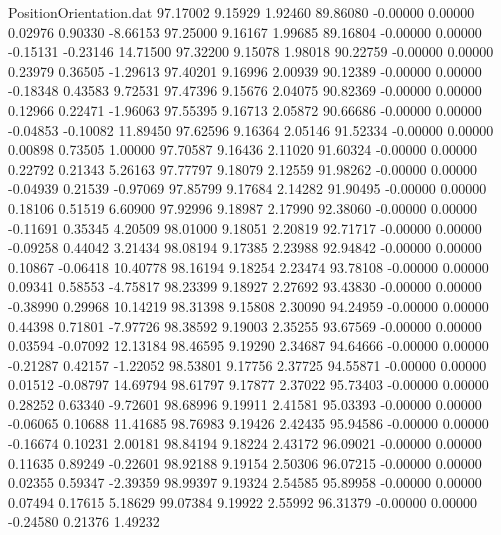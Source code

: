 \begin{filecontents}{PositionOrientation.dat}
  97.17002    9.15929    1.92460    89.86080   -0.00000    0.00000    0.02976    0.90330   -8.66153
  97.25000    9.16167    1.99685    89.16804   -0.00000    0.00000   -0.15131   -0.23146   14.71500
  97.32200    9.15078    1.98018    90.22759   -0.00000    0.00000    0.23979    0.36505   -1.29613
  97.40201    9.16996    2.00939    90.12389   -0.00000    0.00000   -0.18348    0.43583    9.72531
  97.47396    9.15676    2.04075    90.82369   -0.00000    0.00000    0.12966    0.22471   -1.96063
  97.55395    9.16713    2.05872    90.66686   -0.00000    0.00000   -0.04853   -0.10082   11.89450
  97.62596    9.16364    2.05146    91.52334   -0.00000    0.00000    0.00898    0.73505    1.00000
  97.70587    9.16436    2.11020    91.60324   -0.00000    0.00000    0.22792    0.21343    5.26163
  97.77797    9.18079    2.12559    91.98262   -0.00000    0.00000   -0.04939    0.21539   -0.97069
  97.85799    9.17684    2.14282    91.90495   -0.00000    0.00000    0.18106    0.51519    6.60900
  97.92996    9.18987    2.17990    92.38060   -0.00000    0.00000   -0.11691    0.35345    4.20509
  98.01000    9.18051    2.20819    92.71717   -0.00000    0.00000   -0.09258    0.44042    3.21434
  98.08194    9.17385    2.23988    92.94842   -0.00000    0.00000    0.10867   -0.06418   10.40778
  98.16194    9.18254    2.23474    93.78108   -0.00000    0.00000    0.09341    0.58553   -4.75817
  98.23399    9.18927    2.27692    93.43830   -0.00000    0.00000   -0.38990    0.29968   10.14219
  98.31398    9.15808    2.30090    94.24959   -0.00000    0.00000    0.44398    0.71801   -7.97726
  98.38592    9.19003    2.35255    93.67569   -0.00000    0.00000    0.03594   -0.07092   12.13184
  98.46595    9.19290    2.34687    94.64666   -0.00000    0.00000   -0.21287    0.42157   -1.22052
  98.53801    9.17756    2.37725    94.55871   -0.00000    0.00000    0.01512   -0.08797   14.69794
  98.61797    9.17877    2.37022    95.73403   -0.00000    0.00000    0.28252    0.63340   -9.72601
  98.68996    9.19911    2.41581    95.03393   -0.00000    0.00000   -0.06065    0.10688   11.41685
  98.76983    9.19426    2.42435    95.94586   -0.00000    0.00000   -0.16674    0.10231    2.00181
  98.84194    9.18224    2.43172    96.09021   -0.00000    0.00000    0.11635    0.89249   -0.22601
  98.92188    9.19154    2.50306    96.07215   -0.00000    0.00000    0.02355    0.59347   -2.39359
  98.99397    9.19324    2.54585    95.89958   -0.00000    0.00000    0.07494    0.17615    5.18629
  99.07384    9.19922    2.55992    96.31379   -0.00000    0.00000   -0.24580    0.21376    1.49232

\end{filecontents}
